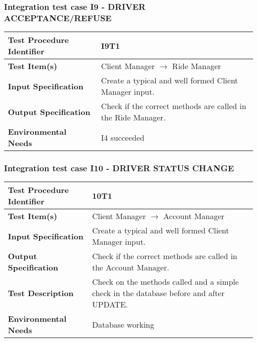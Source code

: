 \subsubsection{Integration test case I9 - DRIVER ACCEPTANCE/REFUSE }
 \begin{tabular}{l p{}}
    \hline
    \textbf{Test Procedure Identifier} & I9T1  \\
    \hline
    \textbf{Test Item(s)} & Client Manager  $\rightarrow$ Ride Manager \\
    \hline
    \textbf{Input Specification} &  Create a typical and well formed Client Manager input.   \\
    \hline
    \textbf{Output Specification} & Check if the correct methods are called in the Ride Manager. \\
    \hline
    \textbf{Environmental Needs} & I4 succeeded \\
    \hline
\end{tabular}

\hfill \newline \newline  
\subsubsection{Integration test case I10 - DRIVER STATUS CHANGE } 
\begin{tabular}{l p{}}
    \hline
    \textbf{Test Procedure Identifier} & 10T1 \\
    \hline
    \textbf{Test Item(s)} & Client Manager  $\rightarrow$ Account Manager \\
    \hline
    \textbf{Input Specification} &  Create a typical and well formed Client Manager input. \\
    \hline
    \textbf{Output Specification} &  Check if the correct methods are called in the Account Manager.\\
    \hline
    \textbf{Test Description} & Check on the methods called and a simple check in the database before and after UPDATE. \\
    \hline
    \textbf{Environmental Needs} & Database working \\
    \hline
\end{tabular}